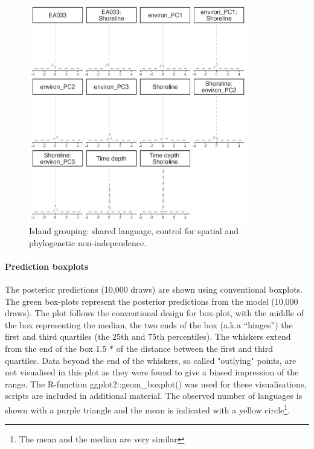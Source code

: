 \documentclass[unnumsec,webpdf,modern,medium]{oup-authoring-template}
\begin{document}
\begin{figure}[ht]
\includegraphics[width=0.85\textwidth]{brms_medium_control_spatialphylo_group_full_effect_ridge_panels_plot.png}
\caption{Island grouping: shared language, control for spatial and phylogenetic non-independence.}
\label{brms_medium_control_spatialphylo_group_full_effect_ridge_panels_plot}
\end{figure}



\FloatBarrier
\paragraph{Prediction boxplots}
\label{appendix_supp_figs_pred_boxplots}

The posterior predictions (10,000 draws) are shown using conventional boxplots. The green box-plots represent the posterior predictions from the model (10,000 draws). The plot follows the conventional design for box-plot, with the middle of the box representing the median, the two ends of the box (a.k.a ``hinges'') the first and third quartiles (the 25th and 75th percentiles). The whiskers extend from the end of the box 1.5 $\ast$  of the distance between the first and third quartiles. Data beyond the end of the whiskers, so called "outlying" points, are not visualised in this plot as they were found to give a biased impression of the range. The R-function  ggplot2::geom\_boxplot() was used for these visualisations, scripts are included in additional material. The observed number of languages is shown with a purple triangle and the mean is indicated with a yellow circle\footnote{The mean and the median are very similar}.
\end{document}
